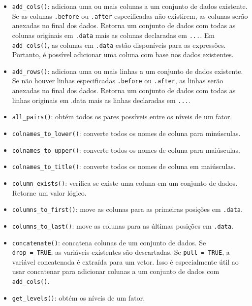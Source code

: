 \documentclass[
]{book}
\providecommand{\tightlist}{%
  \setlength{\itemsep}{0pt}\setlength{\parskip}{0pt}}
\begin{document}
\begin{itemize}
\tightlist
\item
  \texttt{add\_cols()}: adiciona uma ou mais colunas a um conjunto de dados existente. Se as colunas \texttt{.before} ou \texttt{.after} especificadas não existirem, as colunas serão anexadas no final dos dados. Retorna um conjunto de dados com todas as colunas originais em \texttt{.data} mais as colunas declaradas em \texttt{...}. Em \texttt{add\_cols()}, as colunas em \texttt{.data} estão disponíveis para as expressões. Portanto, é possível adicionar uma coluna com base nos dados existentes.
\item
  \texttt{add\_rows()}: adiciona uma ou mais linhas a um conjunto de dados existente. Se não houver linhas especificadas \texttt{.before} ou \texttt{.after}, as linhas serão anexadas no final dos dados. Retorna um conjunto de dados com todas as linhas originais em .data mais as linhas declaradas em \texttt{...}.
\item
  \texttt{all\_pairs()}: obtém todos os pares possíveis entre os níveis de um fator.
\item
  \texttt{colnames\_to\_lower()}: converte todos os nomes de coluna para minúsculas.
\item
  \texttt{colnames\_to\_upper()}: converte todos os nomes de coluna para maiúsculas.
\item
  \texttt{colnames\_to\_title()}: converte todos os nomes de coluna em maiúsculas.
\item
  \texttt{column\_exists()}: verifica se existe uma coluna em um conjunto de dados. Retorne um valor lógico.
\item
  \texttt{columns\_to\_first()}: move as colunas para as primeiras posições em \texttt{.data}.
\item
  \texttt{columns\_to\_last()}: move as colunas para as últimas posições em \texttt{.data}.
\item
  \texttt{concatenate()}: concatena colunas de um conjunto de dados. Se \texttt{drop\ =\ TRUE}, as variáveis existentes são descartadas. Se \texttt{pull\ =\ TRUE}, a variável concatenada é extraída para um vetor. Isso é especialmente útil ao usar concatenar para adicionar colunas a um conjunto de dados com \texttt{add\_cols()}.
\item
  \texttt{get\_levels()}: obtém os níveis de um fator.

\end{itemize}
\end{document}

